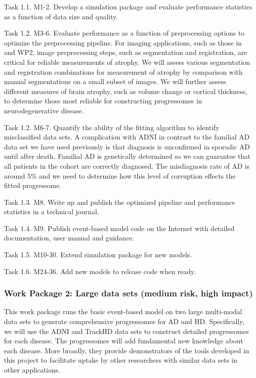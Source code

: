 \documentclass[a4paper,11pt]{article}
\begin{document}
Task 1.1. M1-2. Develop a simulation package and evaluate performance
statistics as a function of data size and quality.

Task 1.2. M3-6. Evaluate performance as a function of preprocessing
options to optimize the preprocessing pipeline.  For imaging
applications, such as those in~\cite{FonteijnScience11} and WP2, image
preprocessing steps, such as segmentation and registration, are
critical for reliable measurements of atrophy.  We will assess various
segmentation and registration combinations for measurement of atrophy
by comparison with manual segmentations on a small subset of images.
We will further assess different measures of brain atrophy, such as
volume change or cortical thickness, to determine those most reliable
for constructing progressomes in neurodegenerative disease.

Task 1.2. M6-7. Quantify the ability of the fitting algorithm to
identify misclassified data sets.  A complication with ADNI in
contrast to the familial AD data set we have used previously is that
diagnosis is unconfirmed in sporadic AD until after death.  Familial
AD is genetically determined so we can guarantee that all patients in
the cohort are correctly diagnosed.  The misdiagnosis rate of AD is
around $5\%$ and we need to determine how this level of corruption
effects the fitted progressome.

Task 1.3. M8. Write up and publish the optimized pipeline and
performance statistics in a technical journal.

Task 1.4. M9. Publish event-based model code on the Internet with
detailed documentation, user manual and guidance.

Task 1.5. M10-30. Extend simulation package for new models.

Task 1.6. M24-36. Add new models to release code when ready.

\subsubsection*{Work Package 2: Large data sets (medium risk, high
impact)}

This work package runs the basic event-based model on two large
multi-modal data sets to generate comprehensive progressomes for AD
and HD.  Specifically, we will use the ADNI and TrackHD data sets to
construct detailed progressomes for each disease.  The progressomes
will add fundamental new knowledge about each disease.  More broadly,
they provide demonstrators of the tools developed in this project to
facilitate uptake by other researchers with similar data sets in other
applications.
\end{document}
